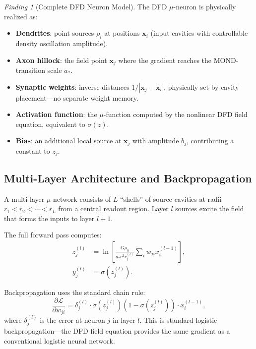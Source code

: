 \documentclass[11pt]{article}
\theoremstyle{definition}
\theoremstyle{remark}
\newtheorem{finding}[theorem]{Finding}
\newcommand{\astar}{a_*}
\begin{document}
\begin{finding}[Complete DFD Neuron Model]
\label{find:dfd_neuron}
The DFD $\mu$-neuron is physically realized as:
\begin{itemize}[nosep]
\item \textbf{Dendrites}: point sources $\rho_i$ at positions $\mathbf{x}_i$
  (input cavities with controllable density oscillation amplitude).
\item \textbf{Axon hillock}: the field point $\mathbf{x}_j$ where the
  gradient reaches the MOND-transition scale $\astar$.
\item \textbf{Synaptic weights}: inverse distances $1/|\mathbf{x}_j - \mathbf{x}_i|$,
  physically set by cavity placement---no separate weight memory.
\item \textbf{Activation function}: the $\mu$-function computed by the
  nonlinear DFD field equation, equivalent to $\sigma(z)$.
\item \textbf{Bias}: an additional local source at $\mathbf{x}_j$ with
  amplitude $b_j$, contributing a constant to $z_j$.
\end{itemize}
\end{finding}

\subsection{Multi-Layer Architecture and Backpropagation}

A multi-layer $\mu$-network consists of $L$ ``shells'' of source cavities
at radii $r_1 < r_2 < \cdots < r_L$ from a central readout region.
Layer $l$ sources excite the field that forms the inputs to layer $l+1$.

The full forward pass computes:
\begin{align}
z_j^{(l)} &= \ln\!\left[\frac{G\rho_0}{\astar c^2 r_j^{(l)}}
\sum_i w_{ji} x_i^{(l-1)}\right], \\
y_j^{(l)} &= \sigma(z_j^{(l)}).
\end{align}

Backpropagation uses the standard chain rule:
\begin{equation}
\frac{\partial\mathcal{L}}{\partial w_{ji}} =
\delta_j^{(l)} \cdot \sigma(z_j^{(l)})(1-\sigma(z_j^{(l)})) \cdot x_i^{(l-1)},
\end{equation}
where $\delta_j^{(l)}$ is the error at neuron $j$ in layer $l$. This is
standard logistic backpropagation---the DFD field equation provides the
same gradient as a conventional logistic neural network.
\end{document}
